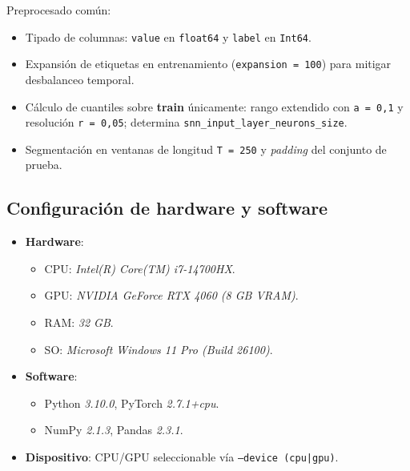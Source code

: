 Preprocesado común:
\begin{itemize}
    \item Tipado de columnas: \texttt{value} en \texttt{float64} y \texttt{label} en \texttt{Int64}.
    \item Expansión de etiquetas en entrenamiento (\texttt{expansion = 100}) para mitigar desbalanceo temporal.
    \item Cálculo de cuantiles sobre \textbf{train} únicamente: rango extendido con \texttt{a = 0{,}1} y resolución \texttt{r = 0{,}05}; determina \texttt{snn\_input\_layer\_neurons\_size}.
    \item Segmentación en ventanas de longitud \texttt{T = 250} y \textit{padding} del conjunto de prueba.
\end{itemize}

\subsection{Configuración de hardware y software}
\begin{itemize}
    \item \textbf{Hardware}:
    \begin{itemize}
        \item CPU: \textit{Intel(R) Core(TM) i7-14700HX}.
        \item GPU: \textit{NVIDIA GeForce RTX 4060 (8 GB VRAM)}.
        \item RAM: \textit{32 GB}.
        \item SO: \textit{Microsoft Windows 11 Pro (Build 26100)}.
    \end{itemize}
    \item \textbf{Software}:
    \begin{itemize}
        \item Python \textit{3.10.0}, PyTorch \textit{2.7.1+cpu}.
        \item NumPy \textit{2.1.3}, Pandas \textit{2.3.1}.
    \end{itemize}
    \item \textbf{Dispositivo}: CPU/GPU seleccionable vía \texttt{--device (cpu|gpu)}.

\end{itemize}


